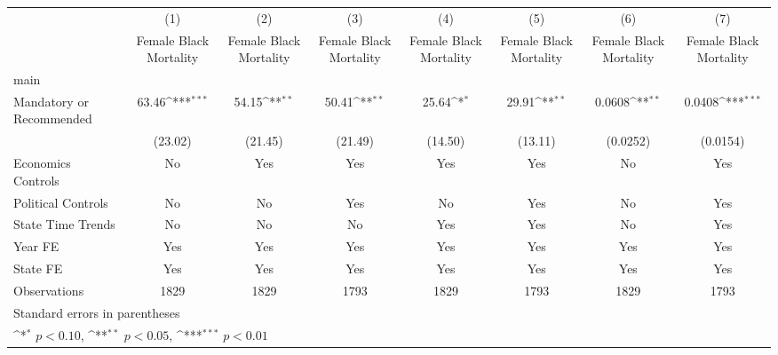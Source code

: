 {
\def\sym#1{\ifmmode^{#1}\else\(^{#1}\)\fi}
\begin{longtable}{l*{7}{c}}
\hline\hline\endfirsthead\hline\endhead\hline\endfoot\endlastfoot
                    &\multicolumn{1}{c}{(1)}&\multicolumn{1}{c}{(2)}&\multicolumn{1}{c}{(3)}&\multicolumn{1}{c}{(4)}&\multicolumn{1}{c}{(5)}&\multicolumn{1}{c}{(6)}&\multicolumn{1}{c}{(7)}\\
                    &\multicolumn{1}{c}{Female Black Mortality}&\multicolumn{1}{c}{Female Black Mortality}&\multicolumn{1}{c}{Female Black Mortality}&\multicolumn{1}{c}{Female Black Mortality}&\multicolumn{1}{c}{Female Black Mortality}&\multicolumn{1}{c}{Female Black Mortality}&\multicolumn{1}{c}{Female Black Mortality}\\
\hline
main                &                     &                     &                     &                     &                     &                     &                     \\
Mandatory or Recommended&       63.46\sym{***}&       54.15\sym{**} &       50.41\sym{**} &       25.64\sym{*}  &       29.91\sym{**} &      0.0608\sym{**} &      0.0408\sym{***}\\
                    &     (23.02)         &     (21.45)         &     (21.49)         &     (14.50)         &     (13.11)         &    (0.0252)         &    (0.0154)         \\
[1em]
Economics Controls  &          No         &         Yes         &         Yes         &         Yes         &         Yes         &          No         &         Yes         \\
[1em]
Political Controls  &          No         &          No         &         Yes         &          No         &         Yes         &          No         &         Yes         \\
[1em]
State Time Trends   &          No         &          No         &          No         &         Yes         &         Yes         &          No         &         Yes         \\
[1em]
Year FE             &         Yes         &         Yes         &         Yes         &         Yes         &         Yes         &         Yes         &         Yes         \\
[1em]
State FE            &         Yes         &         Yes         &         Yes         &         Yes         &         Yes         &         Yes         &         Yes         \\
\hline
Observations        &        1829         &        1829         &        1793         &        1829         &        1793         &        1829         &        1793         \\
\hline\hline
\multicolumn{8}{l}{\footnotesize Standard errors in parentheses}\\
\multicolumn{8}{l}{\footnotesize \sym{*} \(p<0.10\), \sym{**} \(p<0.05\), \sym{***} \(p<0.01\)}\\
\end{longtable}
}
